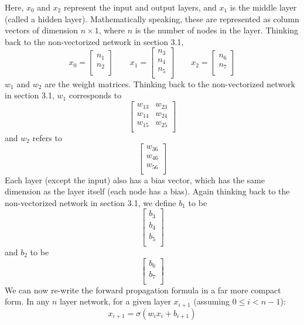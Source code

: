 \documentclass{article}
\begin{document}
Here, $x_0$ and $x_2$ represent the input and output layers, and $x_1$ is the middle layer (called a hidden layer). Mathematically speaking, these are represented as column vectors of dimension $n\times1$, where $n$ is the number of nodes in the layer. Thinking back to the non-vectorized network in section 3.1,
\[x_0 =
\begin{bmatrix}
    n_{1}\\
    n_{2}\\
\end{bmatrix}
\qquad
x_1 =
\begin{bmatrix}
    n_{3}\\
    n_{4}\\
    n_{5}\\
\end{bmatrix}
\qquad
x_2 =
\begin{bmatrix}
    n_{6}\\
    n_{7}\\
\end{bmatrix}
\]
$w_1$ and $w_2$ are the weight matrices. Thinking back to the non-vectorized network in section 3.1, $w_1$ corresponds to
\[
\begin{bmatrix}
    w_{13}       & w_{23}\\
    w_{14}       & w_{24}\\
    w_{15}       & w_{25}\\
\end{bmatrix}
\]
and $w_2$ refers to
\[
\begin{bmatrix}
    w_{36}\\
    w_{46}\\
    w_{56}\\
\end{bmatrix}
\]
Each layer (except the input) also has a bias vector, which has the same dimension as the layer itself (each node has a bias). Again thinking back to the non-vectorized network in section 3.1, we define $b_1$ to be
\[
\begin{bmatrix}
    b_{3}\\
    b_{4}\\
    b_{5}\\
\end{bmatrix}
\]
and $b_2$ to be
\[
\begin{bmatrix}
    b_{6}\\
    b_{7}\\
\end{bmatrix}
\]
We can now re-write the forward propagation formula in a far more compact form. In any $n$ layer network, for a given layer $x_{i+1}$ (assuming $0\leq i<n-1$):
\[x_{i+1} = \sigma(w_ix_i + b_{i+1})\]
\end{document}
